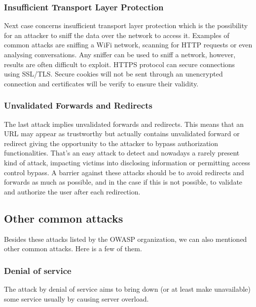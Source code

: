 \subsubsection{Insufficient Transport Layer Protection}
Next case concerns insufficient transport layer protection which is the
possibility for an attacker to sniff the data over the network to access it.
Examples of common attacks are sniffing a WiFi network, scanning for HTTP
requests or even analysing conversations. Any sniffer can be used to sniff a
network, however, results are often difficult to exploit. HTTPS protocol can
secure connections using SSL/TLS. Secure cookies will not be sent through an
unencrypted connection and certificates will be verify to ensure their validity.

\subsubsection{Unvalidated Forwards and Redirects}
The last attack implies unvalidated forwards and redirects. This means that an
URL may appear as trustworthy but actually contains unvalidated forward or
redirect giving the opportunity to the attacker to bypass authorization
functionalities. That's an easy attack to detect and nowadays a rarely present
kind of attack, impacting victims into disclosing information or permitting
access control bypass. A barrier against these attacks should be to avoid
redirects and forwards as much as possible, and in the case if this is not
possible, to validate and authorize the user after each redirection.

\subsection{Other common attacks}
Besides these attacks listed by the OWASP organization, we can also mentioned
other common attacks. Here is a few of them.

\subsubsection{Denial of service}
The attack by denial of service aims to bring down (or at least make
unavailable) some service usually by causing server overload.

